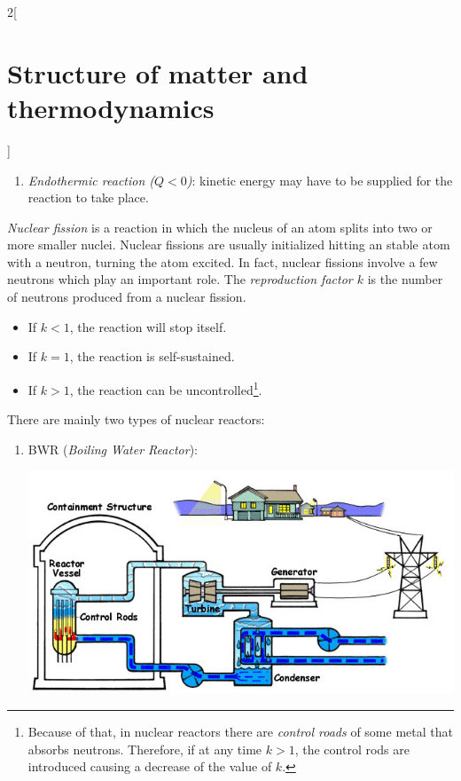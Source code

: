 \documentclass[../../../main.tex]{subfiles}
\begin{document}
\begin{multicols}{2}[\section{Structure of matter and thermodynamics}]
\begin{definition}
\begin{enumerate}
            \item \textit{Endothermic reaction ($Q<0$)}: kinetic energy may have to be supplied for the reaction to take place.
        \end{enumerate}
    \end{definition}
    \begin{definition}
        \textit{Nuclear fission} is a reaction in which the nucleus of an atom splits into two or more smaller nuclei. Nuclear fissions are usually initialized hitting an stable atom with a neutron, turning the atom excited. In fact, nuclear fissions involve a few neutrons which play an important role. The \textit{reproduction factor $k$} is the number of neutrons produced from a nuclear fission.
        \begin{itemize}
            \item If $k<1$, the reaction will stop itself.
            \item If $k=1$, the reaction is self-sustained.
            \item If $k>1$, the reaction can be uncontrolled\footnote{Because of that, in nuclear reactors there are \textit{control roads} of some metal that absorbs neutrons. Therefore, if at any time $k>1$, the control rods are introduced causing a decrease of the value of $k$.}.
        \end{itemize}
    \end{definition}
    \begin{definition}
        There are mainly two types of nuclear reactors:
        \begin{enumerate}
            \item BWR (\textit{Boiling Water Reactor}):
                  \begin{center}
                      \begin{minipage}{\linewidth}
                          \centering
                          \includegraphics[width=\linewidth]{Images/bwr.jpg}

\end{minipage}
\end{center}
\end{enumerate}
\end{definition}
\end{multicols}
\end{document}
